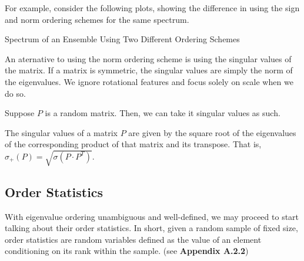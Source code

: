 For example, consider the following plots, showing the difference in using the sign and norm ordering schemes for the same spectrum.

{Spectrum of an Ensemble Using Two Different Ordering Schemes}

\newpage
{}

An aternative to using the norm ordering scheme is using the singular values of the matrix.
If a matrix is symmetric, the singular values are simply the norm of the eigenvalues.
We ignore rotational features and focus solely on scale when we do so.

Suppose $P$ is a random matrix. Then, we can take it singular values as such.

\begin{definition}
The singular values of a matrix $P$ are given by the square root of the eigenvalues of the corresponding product of that matrix and its transpose. That is, $\sigma_+(P) = \sqrt{\sigma(P \cdot P^T)}$.
\end{definition}


\spectrumschemetable

\newpage
\subsection{Order Statistics}


With eigenvalue ordering unambiguous and well-defined, we may proceed to start talking about their order statistics.
In short, given a random sample of fixed size, order statistics are random variables defined as the value of an element conditioning on its rank within the sample. (see \textbf{Appendix A.2.2})


